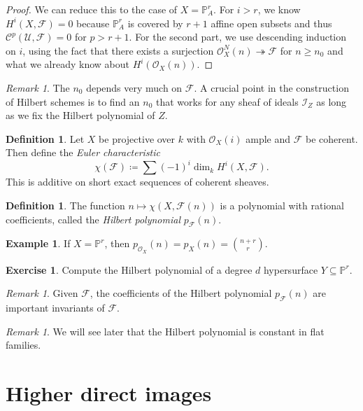 \documentclass[leqno, openany]{memoir}
\theoremstyle{definition}
\newtheorem{defn}[thm]{Definition}
\newtheorem{exm}[thm]{Example}
\newtheorem{exer}[thm]{Exercise}
\theoremstyle{remark}
\newtheorem{rmk}[thm]{Remark}
\theoremstyle{plain}
\theoremstyle{definition}
\theoremstyle{remark}
\renewcommand{\P}{\mathbb{P}}
\newcommand{\mc}[1]{\mathcal{#1}}
\begin{document}
\begin{proof} We can reduce this to the case of $X = \P^r_A$. For $i > r$, we
    know $H^i(X, \mc{F}) = 0$ because $\P^r_A$ is covered by $r+1$ affine open
    subsets and thus $\mc{C}^p(\mc{U}, \mc{F}) = 0$ for $p > r+1$. For the
    second part, we use descending induction on $i$, using the fact that there
    exists a surjection $\mc{O}_X^N(n) \twoheadrightarrow \mc{F}$ for $n \geq
    n_0$ and what we already know about $H^i(\mc{O}_X(n))$.  \end{proof}

\begin{rmk} The $n_0$ depends very much on $\mc{F}$. A crucial point in the
construction of Hilbert schemes is to find an $n_0$ that works for any sheaf of
ideals $\mc{I}_Z$ as long as we fix the Hilbert polynomial of $Z$.  \end{rmk}

\begin{defn} Let $X$ be projective over $k$ with $\mc{O}_X(i)$ ample and
    $\mc{F}$ be coherent. Then define the \textit{Euler characteristic} \[
    \chi(\mc{F}) \coloneqq \sum {(-1)}^i \dim_k H^i(X, \mc{F}). \] This is
    additive on short exact sequences of coherent sheaves.  \end{defn}

\begin{defn} The function $n \mapsto \chi(X, \mc{F}(n))$ is a polynomial with
rational coefficients, called the \textit{Hilbert polynomial} $p_{\mc{F}}(n)$.
\end{defn}

\begin{exm} If $X = \P^r$, then $p_{\mc{O}_X}(n) = p_X(n) = \binom{n+r}{r}$.
\end{exm}

\begin{exer} Compute the Hilbert polynomial of a degree $d$ hypersurface $Y
\subseteq \P^r$.  \end{exer}

\begin{rmk} Given $\mc{F}$, the coefficients of the Hilbert polynomial
$p_{\mc{F}}(n)$ are important invariants of $\mc{F}$.  \end{rmk}

\begin{rmk} We will see later that the Hilbert polynomial is constant in flat
families.  \end{rmk}

\section{Higher direct images}%
\end{document}
